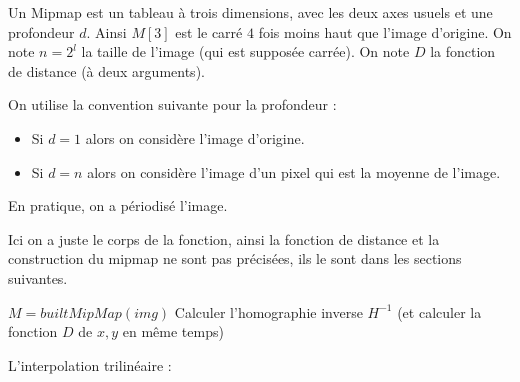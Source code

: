 

Un Mipmap est un tableau à trois dimensions, avec les deux axes usuels et une profondeur $d$.
Ainsi $M[3]$ est le carré $4$ fois moins haut que l'image d'origine. On note $n=2^l$ la taille de l'image (qui est supposée carrée). On note $D$ la fonction de distance (à deux arguments).

On utilise la convention suivante pour la profondeur : 
\begin{itemize}
\item Si $d = 1$ alors on considère l'image d'origine.
\item Si $d = n$ alors on considère l'image d'un pixel qui est la moyenne de l'image.
\end{itemize}

En pratique, on a périodisé l'image.


Ici on a juste le corps de la fonction, ainsi la fonction de distance et la construction du mipmap ne sont pas précisées, ils le sont dans les sections suivantes.
\medbreak
\medbreak
\begin{algorithm}[H]
\caption{$mainFunction(img,H,I)$}
$M=builtMipMap(img)$ \;%
Calculer l'homographie inverse $H^{-1}$ (et calculer la fonction $D$ de $x,y$ en même temps)\;
\end{algorithm}

\medbreak
\medbreak
L'interpolation trilinéaire :
\medbreak
\medbreak

\begin{algorithm}[H]
\caption{$evalPixel(u,v,d,M)$}

\end{algorithm}

